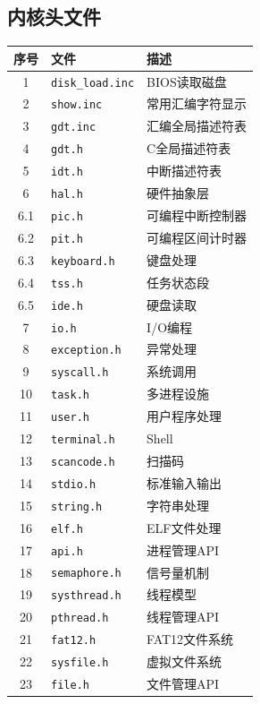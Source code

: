 \documentclass[logo,reportComp]{thesis}
\begin{document}
\subsection{内核头文件}
\begin{center}
\begin{tabular}{|c|l|l|}\hline
\textbf{序号} & \textbf{文件} & \textbf{描述} \\\hline
1 & \verb'disk_load.inc' & BIOS读取磁盘\\\hline
2 & \verb'show.inc' & 常用汇编字符显示\\\hline
3 & \verb'gdt.inc' & 汇编全局描述符表\\\hline
4 & \verb'gdt.h' & C全局描述符表\\\hline
5 & \verb'idt.h' & 中断描述符表\\\hline
6 & \verb'hal.h' & 硬件抽象层\\\hline
6.1 & \verb'pic.h' & 可编程中断控制器\\\hline
6.2 & \verb'pit.h' & 可编程区间计时器\\\hline
6.3 & \verb'keyboard.h' & 键盘处理\\\hline
6.4 & \verb'tss.h' & 任务状态段\\\hline
6.5 & \verb'ide.h' & 硬盘读取\\\hline
7 & \verb'io.h' & I/O编程\\\hline
8 & \verb'exception.h' & 异常处理\\\hline
9 & \verb'syscall.h' & 系统调用\\\hline
10 & \verb'task.h' & 多进程设施\\\hline
11 & \verb'user.h' & 用户程序处理\\\hline
12 & \verb'terminal.h' & Shell\\\hline
13 & \verb'scancode.h' & 扫描码\\\hline
14 & \verb'stdio.h' & 标准输入输出\\\hline
15 & \verb'string.h' & 字符串处理\\\hline
16 & \verb'elf.h' & ELF文件处理\\\hline
17 & \verb'api.h' & 进程管理API\\\hline
18 & \verb'semaphore.h' & 信号量机制\\\hline
19 & \verb'systhread.h' & 线程模型\\\hline
20 & \verb'pthread.h' & 线程管理API\\\hline
21 & \verb'fat12.h' & FAT12文件系统\\\hline
22 & \verb'sysfile.h' & 虚拟文件系统\\\hline
23 & \verb'file.h' & 文件管理API\\\hline
\end{tabular}
\end{center}
\end{document}

